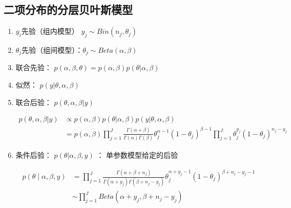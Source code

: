 \subsection{二项分布的分层贝叶斯模型}

\begin{enumerate}
\def\labelenumi{\arabic{enumi}.}
\item \(y_i\)先验（组内模型） \(y_j \sim Bin(n_j,\theta_j)\)
\item \(\theta_j\)先验（组间模型）：\(\theta_j\sim Beta(\alpha,\beta)\)
\item 联合先验：
      \(p(\alpha,\beta,\theta)=p(\alpha,\beta)p(\theta|\alpha,\beta)\)
\item 似然：
      \(p(y|\theta,\alpha,\beta)\)
\item 联合后验：
      \(p(\theta,\alpha,\beta|y)\)

\begin{equation}
  \begin{aligned}
    p(\theta,\alpha,\beta|y)
    &\propto p(\alpha,\beta)p(\theta|\alpha,\beta)p(y|\theta,\alpha,\beta)\\
    &=p(\alpha,\beta)\prod_{j=1}^{J}
    \frac{\Gamma(\alpha+\beta)}{\Gamma(\alpha)\Gamma(\beta)}
    \theta_j^{\alpha-1}(1-\theta_j)^{\beta-1}
    \prod_{j=1}^{J}
    \theta_j^{y_j}(1-\theta_j)^{n_j-y_j}
    \end{aligned}
\end{equation}

\item
  条件后验： \(p(\theta|\alpha,\beta,y)\) ： 单参数模型给定的后验

\begin{equation}
  \begin{aligned}
    p(\theta \mid \alpha, \beta, y)
    &=\prod_{j=1}^{J} \frac{\Gamma\left(\alpha+\beta+n_{j}\right)}{\Gamma\left(\alpha+y_{j}\right) \Gamma\left(\beta+n_{j}-y_{j}\right)} 
    \theta_{j}^{\alpha+y_{j}-1}\left(1-\theta_{j}\right)^{\beta+n_{j}-y_{j}-1}\\
    &\sim \prod _{j=1}^JBeta(\alpha+y_j,\beta+n_j-y_j)
    \end{aligned}
\end{equation}


\end{enumerate}
